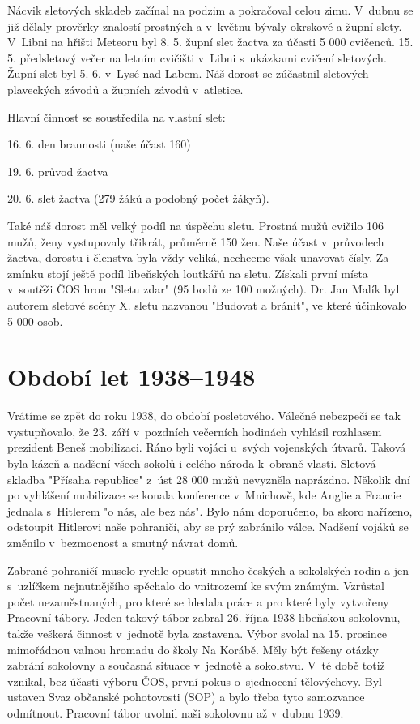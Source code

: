 \documentclass[a5paper, 11pt, twoside]{article}
\begin{document}
Nácvik sletových skladeb začínal na podzim a pokračoval celou zimu.
V~dubnu se již dělaly prověrky znalostí prostných a v~květnu bývaly
okrskové a župní slety. V~Libni na hřišti Meteoru byl 8. 5. župní slet
žactva za účasti 5 000 cvičenců. 15. 5. předsletový večer na letním
cvičišti v~Libni s~ukázkami cvičení sletových. Župní slet byl 5. 6.
v~Lysé nad Labem. Náš dorost se zúčastnil sletových plaveckých závodů a
župních závodů v~atletice.

Hlavní činnost se soustředila na vlastní slet:

16. 6. den brannosti (naše účast 160)

19. 6. průvod žactva

20. 6. slet žactva (279 žáků a podobný počet žákyň).

Také náš dorost měl velký podíl na úspěchu sletu. Prostná mužů cvičilo
106 mužů, ženy vystupovaly třikrát, průměrně 150 žen. Naše účast
v~průvodech žactva, dorostu i členstva byla vždy veliká, nechceme však
unavovat čísly. Za zmínku stojí ještě podíl libeňských loutkářů na
sletu. Získali první místa v~soutěži ČOS hrou "Sletu zdar" (95 bodů ze
100 možných). Dr. Jan Malík byl autorem sletové scény X. sletu nazvanou
"Budovat a bránit", ve které účinkovalo 5 000 osob.

\section{Období let 1938--1948}

Vrátíme se zpět do roku 1938, do období posletového. Válečné nebezpečí
se tak vystupňovalo, že 23. září v~pozdních večerních hodinách vyhlásil
rozhlasem prezident Beneš mobilizaci. Ráno byli vojáci u~svých
vojenských útvarů. Taková byla kázeň a nadšení všech sokolů i celého
národa k~obraně vlasti. Sletová skladba "Přísaha republice" z~úst 28
000 mužů nevyzněla naprázdno. Několik dní po vyhlášení mobilizace se
konala konference v~Mnichově, kde Anglie a Francie jednala s~Hitlerem "o
nás, ale bez nás". Bylo nám doporučeno, ba skoro nařízeno, odstoupit
Hitlerovi naše pohraničí, aby se prý zabránilo válce. Nadšení vojáků se
změnilo v~bezmocnost a smutný návrat domů.

Zabrané pohraničí muselo rychle opustit mnoho českých a sokolských rodin
a jen s~uzlíčkem nejnutnějšího spěchalo do vnitrozemí ke svým známým.
Vzrůstal počet nezaměstnaných, pro které se hledala práce a pro které
byly vytvořeny Pracovní tábory. Jeden takový tábor zabral 26. října 1938
libeňskou sokolovnu, takže veškerá činnost v~jednotě byla zastavena.
Výbor svolal na 15. prosince mimořádnou valnou hromadu do školy Na
Korábě. Měly být řešeny otázky zabrání sokolovny a současná situace
v~jednotě a sokolstvu. V~té době totiž vznikal, bez účasti výboru ČOS,
první pokus o~sjednocení tělovýchovy. Byl ustaven Svaz občanské
pohotovosti (SOP) a bylo třeba tyto samozvance odmítnout. Pracovní tábor
uvolnil naši sokolovnu až v~dubnu 1939.
\end{document}

